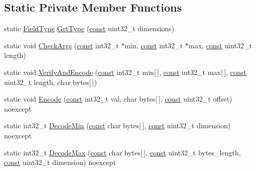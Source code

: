 \subsection*{Static Private Member Functions}
\begin{DoxyCompactItemize}
\item 
static \mbox{\hyperlink{classlucene_1_1core_1_1document_1_1FieldType}{Field\+Type}} \mbox{\hyperlink{classlucene_1_1core_1_1document_1_1IntRange_a14e25efbf2dc2e230dbce3a546338bc2}{Get\+Type}} (\mbox{\hyperlink{ZlibCrc32_8h_a2c212835823e3c54a8ab6d95c652660e}{const}} uint32\+\_\+t dimensions)
\item 
static void \mbox{\hyperlink{classlucene_1_1core_1_1document_1_1IntRange_a5b20608bad7100f0a7254a4fdad3898e}{Check\+Args}} (\mbox{\hyperlink{ZlibCrc32_8h_a2c212835823e3c54a8ab6d95c652660e}{const}} int32\+\_\+t $\ast$min, \mbox{\hyperlink{ZlibCrc32_8h_a2c212835823e3c54a8ab6d95c652660e}{const}} int32\+\_\+t $\ast$max, \mbox{\hyperlink{ZlibCrc32_8h_a2c212835823e3c54a8ab6d95c652660e}{const}} uint32\+\_\+t length)
\item 
static void \mbox{\hyperlink{classlucene_1_1core_1_1document_1_1IntRange_a536d7453de3ac80b6aeba4597e1b65c1}{Verify\+And\+Encode}} (\mbox{\hyperlink{ZlibCrc32_8h_a2c212835823e3c54a8ab6d95c652660e}{const}} int32\+\_\+t min\mbox{[}$\,$\mbox{]}, \mbox{\hyperlink{ZlibCrc32_8h_a2c212835823e3c54a8ab6d95c652660e}{const}} int32\+\_\+t max\mbox{[}$\,$\mbox{]}, \mbox{\hyperlink{ZlibCrc32_8h_a2c212835823e3c54a8ab6d95c652660e}{const}} uint32\+\_\+t length, char bytes\mbox{[}$\,$\mbox{]})
\item 
static void \mbox{\hyperlink{classlucene_1_1core_1_1document_1_1IntRange_a033f58b4f7e2faa72a8ce5e875da527a}{Encode}} (\mbox{\hyperlink{ZlibCrc32_8h_a2c212835823e3c54a8ab6d95c652660e}{const}} int32\+\_\+t val, char bytes\mbox{[}$\,$\mbox{]}, \mbox{\hyperlink{ZlibCrc32_8h_a2c212835823e3c54a8ab6d95c652660e}{const}} uint32\+\_\+t offset) noexcept
\item 
static int32\+\_\+t \mbox{\hyperlink{classlucene_1_1core_1_1document_1_1IntRange_a72ee8f2bcf5b827675b118ff73f650b4}{Decode\+Min}} (\mbox{\hyperlink{ZlibCrc32_8h_a2c212835823e3c54a8ab6d95c652660e}{const}} char bytes\mbox{[}$\,$\mbox{]}, \mbox{\hyperlink{ZlibCrc32_8h_a2c212835823e3c54a8ab6d95c652660e}{const}} uint32\+\_\+t dimension) noexcept
\item 
static int32\+\_\+t \mbox{\hyperlink{classlucene_1_1core_1_1document_1_1IntRange_a2f9b2a70823aa0ae838201b661e3cf9e}{Decode\+Max}} (\mbox{\hyperlink{ZlibCrc32_8h_a2c212835823e3c54a8ab6d95c652660e}{const}} char bytes\mbox{[}$\,$\mbox{]}, \mbox{\hyperlink{ZlibCrc32_8h_a2c212835823e3c54a8ab6d95c652660e}{const}} uint32\+\_\+t bytes\+\_\+length, \mbox{\hyperlink{ZlibCrc32_8h_a2c212835823e3c54a8ab6d95c652660e}{const}} uint32\+\_\+t dimension) noexcept
\end{DoxyCompactItemize}

